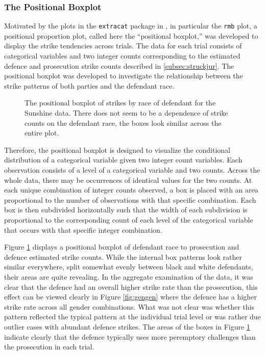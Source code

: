 \subsubsection{The Positional Boxplot}

Motivated by the plots in the \texttt{extracat} package in , in particular the \texttt{rmb} plot, a
positional proportion plot, called here the ``positional boxplot,'' was developed to display the strike tendencies across
trials. The data for each trial consists of categorical variables and two integer counts corresponding to the estimated defence
and prosecution strike counts described in \ref{subsec:struckjur}. The positional boxplot was developed to investigate the
relationship between the strike patterns of both parties and the defendant race.

\begin{figure}[h!]
  \centering
  \caption[Prosecution and Defence Strikes by Trial]{\footnotesize The positional boxplot of strikes by race of defendant for the
    Sunshine data. There does not seem to be a dependence of strike counts on the defendant race, the boxes look similar across
    the entire plot.}
  \label{fig:trialprodef}
\end{figure}

Therefore, the positional boxplot is designed to visualize the conditional distribution of a categorical variable given two
integer count variables. Each observation consists of a level of a categorical variable and two counts. Across the whole data,
there may be occurrences of identical values for the two counts. At each unique combination of integer counts observed, a box is
placed with an area proportional to the number of observations with that specific combination. Each box is then subdivided
horizontally such that the width of each subdivision is proportional to the corresponding count of each level of the categorical
variable that occurs with that specific integer combination.

Figure \ref{fig:trialprodef} displays a positional boxplot of defendant race to prosecution and defence estimated strike
counts. While the internal box patterns look rather similar everywhere, split somewhat evenly between black and white defendants,
their areas are quite revealing. In the aggregate examination of the data, it was clear that the defence had an overall higher
strike rate than the prosecution, this effect can be viewed clearly in Figure \ref{fig:gengen} where the defence has a higher
strike rate across all gender combinations. What was not clear was whether this pattern reflected the typical pattern at the
individual trial level or was rather due outlier cases with abundant defence strikes. The areas of the boxes in Figure
\ref{fig:trialprodef} indicate clearly that the defence typically uses more peremptory challenges than the prosecution in each
trial.

